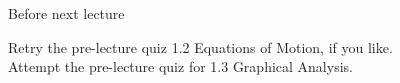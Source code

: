 \begin{frame}{Before next lecture}

Retry the pre-lecture quiz 1.2  Equations of Motion, if you like.\\[1ex]

Attempt the pre-lecture quiz for 1.3  Graphical Analysis.\\

\end{frame}


%
%
%
%
%
%
%
%
%
%
%
%
